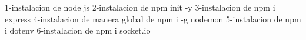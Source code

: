 1-instalacion de node js
2-instalacion de npm init -y
3-instalacion de npm i express
4-instalacion de manera global de npm i -g nodemon
5-instalacion de npm i dotenv
6-instalacion de npm i socket.io

